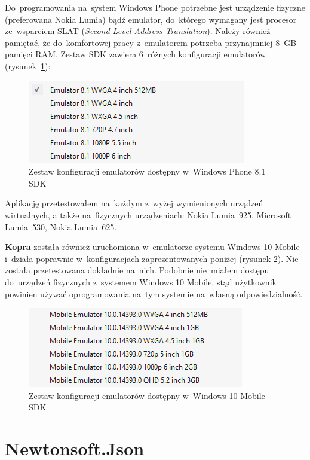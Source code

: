 \documentclass[a4paper,twoside,titlepage,openright]{book}
\begin{document}
Do~programowania na~system Windows Phone potrzebne jest urządzenie fizyczne (preferowana Nokia Lumia) bądź emulator, do~którego wymagany jest procesor ze~wsparciem SLAT (\textit{Second Level Address Translation}). Należy również pamiętać, że do~komfortowej pracy z~emulatorem potrzeba przynajmniej 8~GB pamięci RAM. Zestaw SDK zawiera 6~różnych konfiguracji emulatorów (rysunek~\ref{fig:emulatory}): 

\begin{figure}[h]
	\centering
			\includegraphics[resolution=120]{emulatory.png}
		\caption{Zestaw konfiguracji emulatorów dostępny w~Windows Phone 8.1 SDK}
		\label{fig:emulatory}
\end{figure}

Aplikację przetestowałem na~każdym z~wyżej wymienionych urządzeń wirtualnych, a także na~fizycznych urządzeniach: Nokia Lumia~925, Microsoft Lumia~530, Nokia Lumia~625.

\textbf{Kopra} została również uruchomiona w~emulatorze systemu Windows 10 Mobile i~działa poprawnie w~konfiguracjach zaprezentowanych poniżej (rysunek \ref{fig:emulatoryWin10}). Nie została przetestowana dokładnie na~nich. Podobnie nie~miałem dostępu do~urządzeń fizycznych z~systemem Windows 10 Mobile, stąd użytkownik powinien używać oprogramowania na~tym systemie na~własną odpowiedzialność.

\begin{figure}[htp]
	\centering
			\includegraphics[resolution=120]{emulatoryWin10.png}
		\caption{Zestaw konfiguracji emulatorów dostępny w~Windows 10 Mobile SDK}
		\label{fig:emulatoryWin10}
\end{figure}



\section{Newtonsoft.Json}
\end{document}
